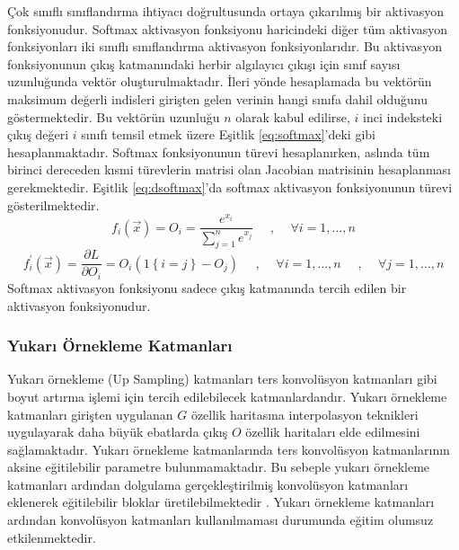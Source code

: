 \begin{itemize}
    Çok sınıflı sınıflandırma ihtiyacı doğrultusunda ortaya çıkarılmış bir aktivasyon fonksiyonudur. Softmax aktivasyon fonksiyonu haricindeki diğer tüm aktivasyon fonksiyonları iki sınıflı sınıflandırma aktivasyon fonksiyonlarıdır. Bu aktivasyon fonksiyonunun çıkış katmanındaki herbir algılayıcı çıkışı için sınıf sayısı uzunluğunda vektör oluşturulmaktadır. İleri yönde hesaplamada bu vektörün maksimum değerli indisleri girişten gelen verinin hangi sınıfa dahil olduğunu göstermektedir. Bu vektörün uzunluğu $n$ olarak kabul edilirse, $i$ inci indeksteki çıkış değeri $i$ sınıfı temsil etmek üzere Eşitlik \ref{eq:softmax}'deki gibi hesaplanmaktadır. Softmax fonksiyonunun türevi hesaplanırken, aslında tüm birinci dereceden kısmi türevlerin matrisi olan Jacobian matrisinin hesaplanması gerekmektedir. Eşitlik \ref{eq:dsoftmax}'da softmax aktivasyon fonksiyonunun türevi gösterilmektedir.
    {\setlength{\mathindent}{0cm}
    \begin{equation}
    	\label{eq:softmax}
    	f_{i}(\vec{x})= O_{i} =\frac{e^{x_{i}}}{\sum_{j=1}^{n} e^{x_{j}}} \quad \text { , } \quad \forall i=1, \ldots, n
    \end{equation}
    \vspace{-1cm}
    \begin{equation}
    	\label{eq:dsoftmax}
    	f^{\prime}_{i}(\vec{x})= \frac{\partial L}{\partial  O_{i}} = O_{i}(1\left\{i=j\right\}-O_{j}) \quad \text { , } \quad \forall i=1, \ldots, n \quad \text { , } \quad \forall j=1, \ldots, n
    \end{equation}}
    Softmax aktivasyon fonksiyonu sadece çıkış katmanında tercih edilen bir aktivasyon fonksiyonudur. 
\end{itemize}

\subsubsection{Yukarı Örnekleme Katmanları}
Yukarı örnekleme (Up Sampling) katmanları ters konvolüsyon katmanları gibi boyut artırma işlemi için tercih edilebilecek katmanlardandır. Yukarı örnekleme katmanları girişten uygulanan $G$ özellik haritasına interpolasyon teknikleri uygulayarak daha büyük ebatlarda çıkış $O$ özellik haritaları elde edilmesini sağlamaktadır. Yukarı örnekleme katmanlarında ters konvolüsyon katmanlarının aksine eğitilebilir parametre bulunmamaktadır. Bu sebeple yukarı örnekleme katmanları ardından dolgulama gerçekleştirilmiş konvolüsyon katmanları eklenerek eğitilebilir bloklar üretilebilmektedir \cite{dumoulin2016guide}. Yukarı örnekleme katmanları ardından konvolüsyon katmanları kullanılmaması durumunda eğitim olumsuz etkilenmektedir.

